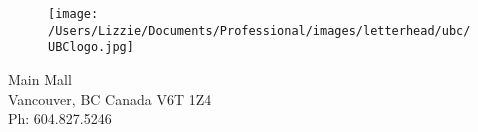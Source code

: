 \documentclass[11pt,a4paper]{article}
\begin{document}
\renewcommand{\refname}{\CHead{}}


\begin{figure}[htbp]
\hspace*{14cm}                                                           
\texttt{[image: /Users/Lizzie/Documents/Professional/images/letterhead/ubc/UBClogo.jpg]}
\end{figure}
\vspace{-10ex}
\begin{small}
 Main Mall \\
\noindent Vancouver, BC Canada V6T 1Z4\\
\noindent Ph: 604.827.5246\\
\end{small}
\vspace{2ex}\\
\end{document}
